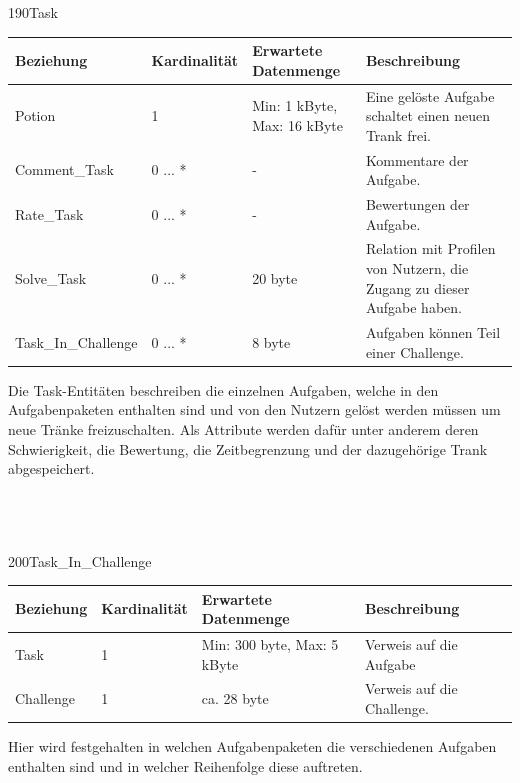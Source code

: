 \newpage
\begin{entity}{190}{Task}
\begin{center}
	\begin{longtable}{|m{4cm}|m{}|m{}|m{}|}
 	 \hline
 	 \textbf{Beziehung} & \textbf{Kardinalität} &  \textbf{Erwartete Datenmenge} & \textbf{Beschreibung} \\
  	\hline
	Potion & 1 & Min: 1 kByte, Max: 16 kByte & Eine gelöste Aufgabe schaltet einen neuen Trank frei.\\
	  \hline
	Comment\_Task & 0 ... * & - & Kommentare der Aufgabe.\\
	  \hline
	Rate\_Task & 0 ... * & - & Bewertungen der Aufgabe.\\
	  \hline
	Solve\_Task & 0 ... * & 20 byte & Relation mit Profilen von Nutzern, die Zugang zu dieser Aufgabe haben.\\
	  \hline
	Task\_In\_Challenge & 0 ... * & 8 byte & Aufgaben können Teil einer Challenge.\\
	  \hline
	\end{longtable}
\end{center}
Die \glqq Task\grqq-Entitäten beschreiben die einzelnen Aufgaben, welche in den Aufgabenpaketen enthalten sind und von den Nutzern gelöst werden müssen um neue Tränke freizuschalten. Als Attribute werden dafür unter anderem deren Schwierigkeit, die Bewertung, die Zeitbegrenzung und der dazugehörige Trank abgespeichert. \\\\\\\
\end{entity}

\begin{entity}{200}{Task\_In\_Challenge}
\begin{center}
	\begin{longtable}{|m{4cm}|m{}|m{}|m{}|}
 	 \hline
 	 \textbf{Beziehung} & \textbf{Kardinalität} &  \textbf{Erwartete Datenmenge} & \textbf{Beschreibung} \\
  	\hline
	Task & 1 & Min: 300 byte, Max: 5 kByte & Verweis auf die Aufgabe\\
	  \hline
  	Challenge & 1  & ca. 28 byte & Verweis auf die Challenge.\\
	  \hline
	\end{longtable}
\end{center}
Hier wird festgehalten in welchen Aufgabenpaketen die verschiedenen Aufgaben enthalten sind und in welcher Reihenfolge diese auftreten.\\\\\\\
\end{entity}

